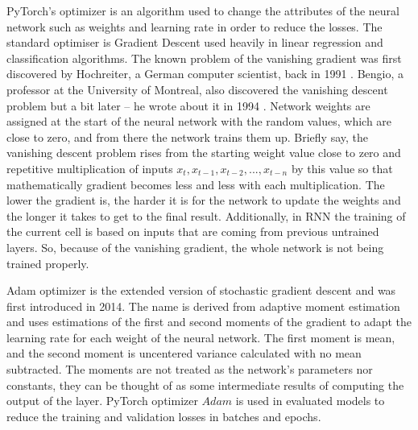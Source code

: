 PyTorch's optimizer is an algorithm used to change the attributes of the neural network such as weights and learning rate in order to reduce the losses. The standard optimiser is Gradient Descent used heavily in linear regression and classification algorithms. The known problem of the vanishing gradient was first discovered by Hochreiter, a German computer scientist, back in 1991 \cite{lstm_orig}. Bengio, a professor at the University of Montreal, also discovered the vanishing descent problem but a bit later – he wrote about it in 1994 \cite{rnn_difficults}. Network weights are assigned at the start of the neural network with the random values, which are close to zero, and from there the network trains them up. Briefly say, the vanishing descent problem rises from the starting weight value close to zero and repetitive multiplication of inputs $x_t, x_{t-1}, x_{t-2},...,x_{t-n}$ by this value so that mathematically gradient becomes less and less with each multiplication. The lower the gradient is, the harder it is for the network to update the weights and the longer it takes to get to the final result. Additionally, in RNN the training of the current cell is based on inputs that are coming from previous untrained layers. So, because of the vanishing gradient, the whole network is not being trained properly.

Adam optimizer is the extended version of stochastic gradient descent and was first introduced in 2014. The name is derived from adaptive moment estimation and uses estimations of the first and second moments of the gradient to adapt the learning rate for each weight of the neural network. The first moment is mean, and the second moment is uncentered variance calculated with no mean subtracted. The moments are not treated as the network's parameters nor constants, they can be thought of as some intermediate results of computing the output of the layer. PyTorch optimizer $Adam$  is used in evaluated models to reduce the training and validation losses in batches and epochs.

